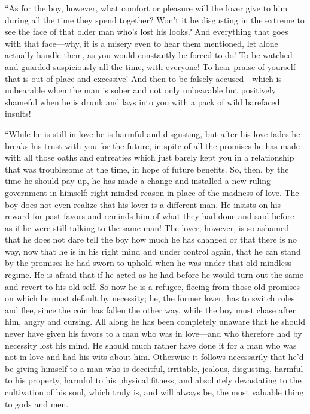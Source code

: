 “As for the boy, however, what comfort or pleasure will the lover give
to him during all the time they spend together? Won’t it be disgusting
in the extreme to see the face of that older man who’s lost his looks?
And everything that goes with that face---why, it is a misery even to
hear them mentioned, let alone actually handle them, as you would
constantly be forced to do! To be watched and guarded
suspiciously all the time, with everyone! To hear praise of yourself
that is out of place and excessive! And then to be falsely
accused---which is unbearable when the man is sober and not only
unbearable but positively shameful when he is drunk and lays into you
with a pack of wild barefaced insults!

“While he is still in love he is harmful and disgusting, but after his
love fades he breaks his trust with you for the future, in spite of all
the promises he has made with all those oaths and entreaties which just
barely kept you in a relationship that was troublesome
at the time, in hope of future benefits. So, then, by the time he should
pay up, he has made a change and installed a new ruling government in
himself: right-minded reason in place of the madness of love. The boy
does not even realize that his lover is a different man. He insists on
his reward for past favors and reminds him of what they had done and
said before---as if he were still talking to the same man! The lover,
however, is so ashamed that he does not dare tell the boy how much he
has changed or that there is no way, now that he is in his right mind
and under control again, that he can stand by the promises he had sworn
to uphold when he was under that old mindless regime. He is
afraid that if he acted as he had before he would turn out the same and
revert to his old self. So now he is a refugee, fleeing from those old
promises on which he must default by necessity; he, the former lover,
has to switch roles and flee, since the coin has fallen the other way,
while the boy must chase after him, angry and cursing. All along he has
been completely unaware that he should never have given his
favors to a man who was in love---and who therefore had by necessity
lost his mind. He should much rather have done it for a man who was not
in love and had his wits about him. Otherwise it follows necessarily
that he’d be giving himself to a man who is deceitful, irritable,
jealous, disgusting, harmful to his property, harmful to his physical
fitness, and absolutely devastating to the cultivation of his soul,
which truly is, and will always be, the most valuable thing to gods and
men.

